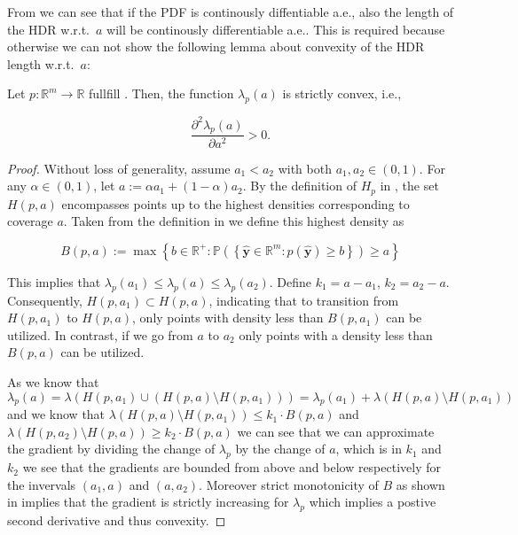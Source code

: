 From  we can see that if the PDF is continously diffentiable a.e., also the length of the HDR w.r.t.\ $a$ will be continously differentiable a.e.. This is required because otherwise we can not show the following lemma about convexity of the HDR length w.r.t.\ $a$:

\begin{lemma}
    Let \(p: \mathbb{R}^m \to \mathbb{R}\) fullfill . Then, the function $\lambda_{p}(a)$ is strictly convex, i.e.,

    \begin{equation}
        \frac{\partial^2 \lambda_{p}(a)}{\partial a^2} > 0.
    \end{equation}

\end{lemma}
\begin{proof}
    Without loss of generality, assume \(a_1 < a_2\) with both \(a_1, a_2 \in (0,1)\). For any \(\alpha \in (0, 1)\), let \(a := \alpha a_1 + (1-\alpha) a_2\). By the definition of \(H_p\) in , the set \(H(p, a)\) encompasses points up to the highest densities corresponding to coverage \(a\). Taken from the definition in  we define this highest density as

    \begin{equation}
        B(p, a):=\max \left\{b \in \mathbb{R^+}: \mathbb{P}\left(\left\{\mathbf{\hat{y}}
        \in
        \mathbb{R}^m: p(\mathbf{\hat{y}}) \geq b\right\}\right) \geq a
        \right\}
    \end{equation}

    This implies that \(\lambda_{p}(a_1) \leq \lambda_{p}(a) \leq \lambda_{p}(a_2)\). Define $k_1 = a-a_1$, $k_2 = a_2 - a$. Consequently, \(H(p, a_1) \subset H(p, a)\), indicating that to transition from \(H(p, a_1)\) to \(H(p, a)\), only points with density less than $B(p, a_1)$ can be utilized. In contrast, if we go from $a$ to $a_2$ only points with a density less than $B(p, a)$ can be utilized.

    As we know that
    \begin{equation}
        \lambda_p(a) = \lambda(H(p, a_1) \cup (H(p,a)\setminus H(p,a_1))) = \lambda_p(a_1) + \lambda(H(p,a)\setminus H(p, a_1))
    \end{equation}
    and we know that $\lambda(H(p,a)\setminus H(p, a_1)) \leq k_1 \cdot B(p, a)$ and $\lambda(H(p,a_2)\setminus H(p, a)) \geq k_2 \cdot B(p, a)$ we can see that we can approximate the gradient by dividing the change of $\lambda_p$ by the change of $a$, which is in $k_1$ and $k_2$ we see that the gradients are bounded from above and below respectively for the invervals $(a_1, a)$ and $(a, a_2)$. Moreover strict monotonicity of $B$ as shown in  implies that the gradient is strictly increasing for $\lambda_p$ which implies a postive second derivative and thus convexity.


\end{proof}
